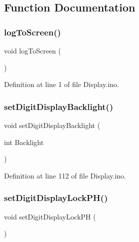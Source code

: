 \subsection{Function Documentation}
\mbox{\label{_display_8ino_a334d5caa6919daf0965dc3946375ec8c}} 
\subsubsection{\texorpdfstring{logToScreen()}{logToScreen()}}
{\footnotesize\ttfamily void log\+To\+Screen (\begin{DoxyParamCaption}{ }\end{DoxyParamCaption})}



Definition at line 1 of file Display.\+ino.

\mbox{\label{_display_8ino_a43bbc37f43ddbbd0173c852bdf884535}} 
\subsubsection{\texorpdfstring{setDigitDisplayBacklight()}{setDigitDisplayBacklight()}}
{\footnotesize\ttfamily void set\+Digit\+Display\+Backlight (\begin{DoxyParamCaption}\item[{int}]{Backlight }\end{DoxyParamCaption})}



Definition at line 112 of file Display.\+ino.

\mbox{\label{_display_8ino_a473c95caf3385fd3e2de85ae367d222d}} 
\subsubsection{\texorpdfstring{setDigitDisplayLockPH()}{setDigitDisplayLockPH()}}
{\footnotesize\ttfamily void set\+Digit\+Display\+Lock\+PH (\begin{DoxyParamCaption}{ }\end{DoxyParamCaption})}



